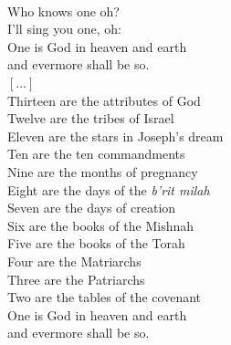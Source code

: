 \documentclass[extrafontsizes,twoside,17pt,a4paper,openany]{memoir}
\newcommand{\HgSource}[1]{\hfill{\small---\itshape{#1}}}
\newcommand{\HgEllipsis}{\ensuremath{\left[\ldots\right]}}
\newenvironment{HgEnglish}{\strut\\\noindent}{\vspace{1em}}
\begin{document}
\begin{multicols}{2}
\begin{HgEnglish}
Who knows one oh? \\
I'll sing you one, oh: \\
One is God in heaven and earth \\
and evermore shall be so. \\
\HgEllipsis \\
Thirteen are the attributes of God \\
Twelve are the tribes of Israel \\
Eleven are the stars in Joseph's dream \\
Ten are the ten commandments \\
Nine are the months of pregnancy \\
Eight are the days of the {\itshape b'rit milah} \\
Seven are the days of creation \\
Six are the books of the Mishnah \\
Five are the books of the Torah \\
Four are the Matriarchs \\
Three are the Patriarchs \\
Two are the tables of the covenant \\
One is God in heaven and earth \\
and evermore shall be so.
\end{HgEnglish}


\end{multicols}

\end{document}
